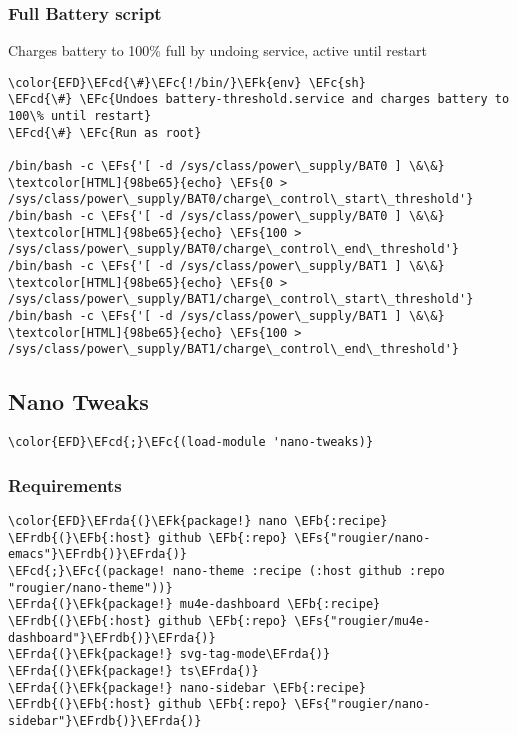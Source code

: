 \documentclass[a4wide,10pt]{article}
\newcommand{\EFc}[1]{\textcolor{EFc}{#1}} %
\newcommand{\EFcd}[1]{\textcolor{EFcd}{#1}} %
\newcommand{\EFs}[1]{\textcolor{EFs}{#1}} %
\newcommand{\EFk}[1]{\textcolor{EFk}{#1}} %
\newcommand{\EFb}[1]{\textcolor{EFb}{#1}} %
\newcommand{\EFrda}[1]{\textcolor{EFrda}{#1}} %
\newcommand{\EFrdb}[1]{\textcolor{EFrdb}{#1}} %
\begin{document}
\subsubsection{Full Battery script}
\label{sec:org4704441}
Charges battery to 100\% full by undoing service, active until restart
\begin{Code}
\begin{Verbatim}
\color{EFD}\EFcd{\#}\EFc{!/bin/}\EFk{env} \EFc{sh}
\EFcd{\#} \EFc{Undoes battery-threshold.service and charges battery to 100\% until restart}
\EFcd{\#} \EFc{Run as root}

/bin/bash -c \EFs{'[ -d /sys/class/power\_supply/BAT0 ] \&\&} \textcolor[HTML]{98be65}{echo} \EFs{0 > /sys/class/power\_supply/BAT0/charge\_control\_start\_threshold'}
/bin/bash -c \EFs{'[ -d /sys/class/power\_supply/BAT0 ] \&\&} \textcolor[HTML]{98be65}{echo} \EFs{100 > /sys/class/power\_supply/BAT0/charge\_control\_end\_threshold'}
/bin/bash -c \EFs{'[ -d /sys/class/power\_supply/BAT1 ] \&\&} \textcolor[HTML]{98be65}{echo} \EFs{0 > /sys/class/power\_supply/BAT1/charge\_control\_start\_threshold'}
/bin/bash -c \EFs{'[ -d /sys/class/power\_supply/BAT1 ] \&\&} \textcolor[HTML]{98be65}{echo} \EFs{100 > /sys/class/power\_supply/BAT1/charge\_control\_end\_threshold'}
\end{Verbatim}
\end{Code}
\subsection{Nano Tweaks}
\label{sec:org98040be}
\begin{Code}
\begin{Verbatim}
\color{EFD}\EFcd{;}\EFc{(load-module 'nano-tweaks)}
\end{Verbatim}
\end{Code}
\subsubsection{Requirements}
\label{sec:org5c24e18}
\begin{Code}
\begin{Verbatim}
\color{EFD}\EFrda{(}\EFk{package!} nano \EFb{:recipe} \EFrdb{(}\EFb{:host} github \EFb{:repo} \EFs{"rougier/nano-emacs"}\EFrdb{)}\EFrda{)}
\EFcd{;}\EFc{(package! nano-theme :recipe (:host github :repo "rougier/nano-theme"))}
\EFrda{(}\EFk{package!} mu4e-dashboard \EFb{:recipe} \EFrdb{(}\EFb{:host} github \EFb{:repo} \EFs{"rougier/mu4e-dashboard"}\EFrdb{)}\EFrda{)}
\EFrda{(}\EFk{package!} svg-tag-mode\EFrda{)}
\EFrda{(}\EFk{package!} ts\EFrda{)}
\EFrda{(}\EFk{package!} nano-sidebar \EFb{:recipe} \EFrdb{(}\EFb{:host} github \EFb{:repo} \EFs{"rougier/nano-sidebar"}\EFrdb{)}\EFrda{)}
\end{Verbatim}
\end{Code}
\end{document}
